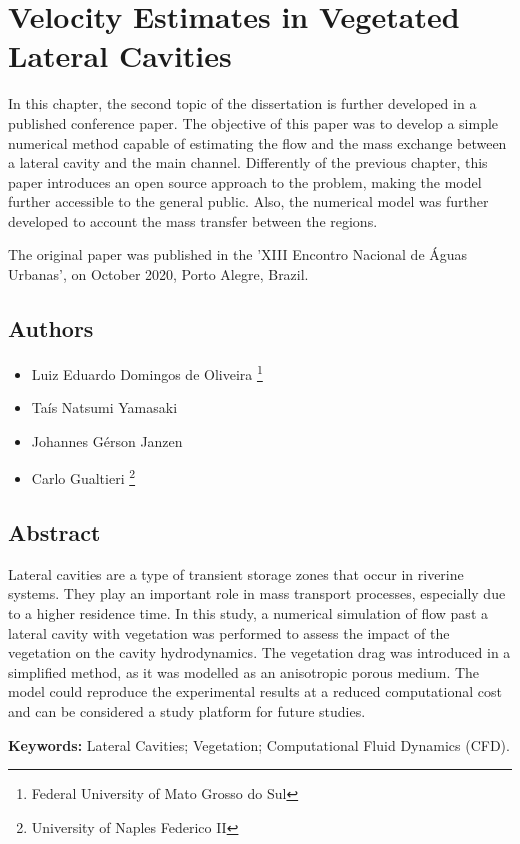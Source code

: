 \chapter{Velocity Estimates in Vegetated Lateral Cavities}
\label{chap:art3}
In this chapter, the second topic of the dissertation is further developed in a published conference paper. The objective of this paper was to develop a simple numerical method capable of estimating the flow and the mass exchange between a lateral cavity and the main channel. Differently of the previous chapter, this paper introduces an open source approach to the problem, making the model further accessible to the general public. Also, the numerical model was further developed to account the mass transfer between the regions.

The original paper was published in the 'XIII Encontro Nacional de Águas Urbanas', on October 2020, Porto Alegre, Brazil.
\section*{Authors}
\begin{itemize}
    \item Luiz Eduardo Domingos de Oliveira \footnote{Federal University of Mato Grosso do Sul}
    \item Taís Natsumi Yamasaki \footnotemark[1]
    \item Johannes Gérson Janzen \footnotemark[1]
    \item Carlo Gualtieri \footnote{University of Naples Federico II}
\end{itemize}
\section*{Abstract}
Lateral cavities are a type of transient storage zones that occur in riverine systems. They play an important role in mass transport processes, especially due to a higher residence time. In this study, a numerical simulation of flow past a lateral cavity with vegetation was performed to assess the impact of the vegetation on the cavity hydrodynamics. The vegetation drag was introduced in a simplified method, as it was modelled as an anisotropic porous medium. The model could reproduce the experimental results at a reduced computational cost and can be considered a study platform for future studies.

\noindent\textbf{Keywords:} Lateral Cavities; Vegetation; Computational Fluid Dynamics (CFD).

